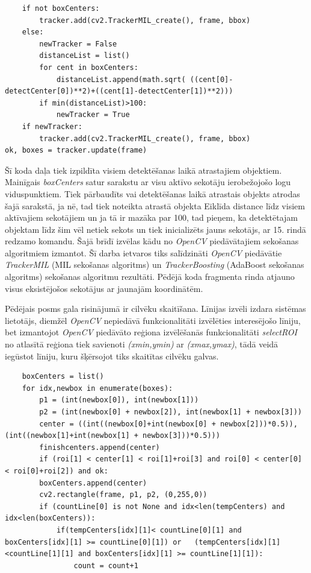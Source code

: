 \begin{lstlisting}           
	if not boxCenters:
		tracker.add(cv2.TrackerMIL_create(), frame, bbox)
	else:
		newTracker = False
		distanceList = list()
		for cent in boxCenters:
			distanceList.append(math.sqrt( ((cent[0]-detectCenter[0])**2)+((cent[1]-detectCenter[1])**2)))
		if min(distanceList)>100:
			newTracker = True
	if newTracker:
		tracker.add(cv2.TrackerMIL_create(), frame, bbox)
ok, boxes = tracker.update(frame)
\end{lstlisting}

Šī koda daļa tiek izpildīta visiem detektēšanas laikā atrastajiem objektiem. Mainīgais \textit{boxCenters} satur sarakstu ar visu aktīvo sekotāju ierobežojošo logu viduspunktiem. Tiek pārbaudīts vai detektēšanas laikā atrastais objekts atrodas šajā sarakstā, ja nē, tad tiek noteikta atrastā objekta Eiklīda distance līdz visiem aktīvajiem sekotājiem un ja tā ir mazāka par 100, tad pieņem, ka detektētajam objektam līdz šim vēl netiek sekots un tiek inicializēts jauns sekotājs, ar 15. rindā redzamo komandu. Šajā brīdī izvēlas kādu no \textit{OpenCV} piedāvātajiem sekošanas algoritmiem izmantot. Šī darba ietvaros tiks salīdzināti \textit{OpenCV} piedāvātie \textit{TrackerMIL} (MIL sekošanas algoritms) un \textit{TrackerBoosting} (AdaBoost sekošanas algoritms) sekošanas algoritmu rezultāti. Pēdējā koda fragmenta rinda atjauno visus eksistējošos sekotājus ar jaunajām koordinātēm. 

Pēdējais posms gala risinājumā ir cilvēku skaitīšana. Līnijas izvēli izdara sistēmas lietotājs, diemžēl \textit{OpenCV} nepiedāvā funkcionalitāti izvēlēties interesējošo līniju, bet izmantojot \textit{OpenCV} piedāvāto reģiona izvēlēšanās funkcionalitāti \textit{selectROI} no atlasītā reģiona tiek savienoti \textit{(xmin,ymin)} ar \textit{(xmax,ymax)}, tādā veidā iegūstot līniju, kuru šķērsojot tiks skaitītas cilvēku galvas.

\begin{lstlisting}
	boxCenters = list()
	for idx,newbox in enumerate(boxes):            
		p1 = (int(newbox[0]), int(newbox[1]))
		p2 = (int(newbox[0] + newbox[2]), int(newbox[1] + newbox[3]))
		center = ((int((newbox[0]+int(newbox[0] + newbox[2]))*0.5)),(int((newbox[1]+int(newbox[1] + newbox[3]))*0.5)))
		finishcenters.append(center)
		if (roi[1] < center[1] < roi[1]+roi[3] and roi[0] < center[0] < roi[0]+roi[2]) and ok:
		boxCenters.append(center)
		cv2.rectangle(frame, p1, p2, (0,255,0))
		if (countLine[0] is not None and idx<len(tempCenters) and idx<len(boxCenters)):
			if(tempCenters[idx][1]< countLine[0][1] and boxCenters[idx][1] >= countLine[0][1]) or 	(tempCenters[idx][1]<countLine[1][1] and boxCenters[idx][1] >= countLine[1][1]):
				count = count+1
\end{lstlisting}

